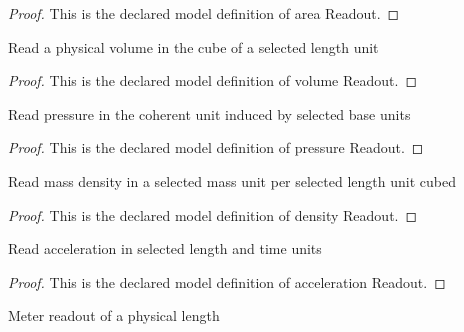 \begin{proof}
  This is the declared model definition of area Readout.
\end{proof}
\begin{definition}
  \label{def:physics:phyx-mini-0364:phyxminiproblems-problemphyxmini0364-volumereadout}
  Read a physical volume in the cube of a selected length unit
\end{definition}
\begin{proof}
  This is the declared model definition of volume Readout.
\end{proof}
\begin{definition}
  \label{def:physics:phyx-mini-0364:phyxminiproblems-problemphyxmini0364-pressurereadout}
  Read pressure in the coherent unit induced by selected base units
\end{definition}
\begin{proof}
  This is the declared model definition of pressure Readout.
\end{proof}
\begin{definition}
  \label{def:physics:phyx-mini-0364:phyxminiproblems-problemphyxmini0364-densityreadout}
  Read mass density in a selected mass unit per selected length unit cubed
\end{definition}
\begin{proof}
  This is the declared model definition of density Readout.
\end{proof}
\begin{definition}
  \label{def:physics:phyx-mini-0364:phyxminiproblems-problemphyxmini0364-accelerationreadout}
  Read acceleration in selected length and time units
\end{definition}
\begin{proof}
  This is the declared model definition of acceleration Readout.
\end{proof}
\begin{definition}
  \label{def:physics:phyx-mini-0364:phyxminiproblems-problemphyxmini0364-lengthinmeters}
  Meter readout of a physical length
\end{definition}
